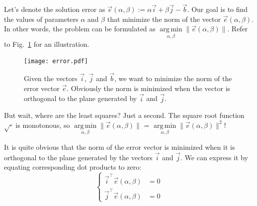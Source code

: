 \documentclass[notitlepage,oneside]{book}
\DeclareMathOperator*{\argmin}{arg\,min}
\begin{document}
Let's denote the solution error as $\vec{e}(\alpha, \beta) :=  \alpha \vec{i} + \beta\vec{j} - \vec b$.
Our goal is to find the values of parameters $\alpha$ and $\beta$ that minimize the norm of the vector $\vec{e}(\alpha, \beta)$. 
In other words, the problem can be formulated as $\argmin\limits_{\alpha, \beta} \|\vec{e}(\alpha, \beta)\|$.
Refer to Fig.~\ref{fig:error} for an illustration.

\begin{figure}[ht]
	\centering
	\texttt{[image: error.pdf]}
	\caption{Given the vectors $\vec i$, $\vec j$ and $\vec b$, we want to minimize the norm of the error vector $\vec e$. 
    Obviously the norm is minimized when the vector is orthogonal to the plane generated by $\vec i$ and $\vec j$.}
	\label{fig:error}
\end{figure}

But wait, where are the least squares? Just a second. The square root function $\sqrt{\cdot}$ is monotonous, so $\argmin\limits_{\alpha, \beta} \|\vec{e}(\alpha, \beta)\|$ = $\argmin\limits_{\alpha, \beta} \|\vec{e}(\alpha, \beta)\|^2$!

It is quite obvious that the norm of the error vector is minimized when it is orthogonal to the plane generated by the vectors $\vec i$ and $\vec j$.
We can express it by equating corresponding dot products to zero:
$$
\left\{
\begin{split}\vec{i}^\top \vec{e}(\alpha, \beta) &= 0\\
\vec{j}^\top \vec{e}(\alpha, \beta) &= 0
\end{split}
\right.
$$
\end{document}
